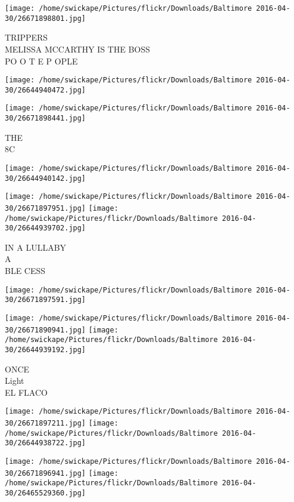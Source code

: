 \documentclass[10pt,letterpaper]{article}
\begin{document}
\vspace{0.25in}
\texttt{[image: /home/swickape/Pictures/flickr/Downloads/Baltimore 2016-04-30/26671898801.jpg]}

TRIPPERS\\
MELISSA MCCARTHY IS THE BOSS\\
PO O T E P OPLE
\pagebreak

\texttt{[image: /home/swickape/Pictures/flickr/Downloads/Baltimore 2016-04-30/26644940472.jpg]}

\vspace{0.25in}
\texttt{[image: /home/swickape/Pictures/flickr/Downloads/Baltimore 2016-04-30/26671898441.jpg]}

THE\\
8C
\pagebreak

\texttt{[image: /home/swickape/Pictures/flickr/Downloads/Baltimore 2016-04-30/26644940142.jpg]}

\vspace{0.25in}
\texttt{[image: /home/swickape/Pictures/flickr/Downloads/Baltimore 2016-04-30/26671897951.jpg]}
\texttt{[image: /home/swickape/Pictures/flickr/Downloads/Baltimore 2016-04-30/26644939702.jpg]}

IN A LULLABY\\
A\\
BLE CESS
\pagebreak

\texttt{[image: /home/swickape/Pictures/flickr/Downloads/Baltimore 2016-04-30/26671897591.jpg]}

\vspace{0.25in}
\texttt{[image: /home/swickape/Pictures/flickr/Downloads/Baltimore 2016-04-30/26671890941.jpg]}
\texttt{[image: /home/swickape/Pictures/flickr/Downloads/Baltimore 2016-04-30/26644939192.jpg]}

ONCE\\
Light\\
EL FLACO
\pagebreak

\texttt{[image: /home/swickape/Pictures/flickr/Downloads/Baltimore 2016-04-30/26671897211.jpg]}
\texttt{[image: /home/swickape/Pictures/flickr/Downloads/Baltimore 2016-04-30/26644938722.jpg]}

\texttt{[image: /home/swickape/Pictures/flickr/Downloads/Baltimore 2016-04-30/26671896941.jpg]}
\texttt{[image: /home/swickape/Pictures/flickr/Downloads/Baltimore 2016-04-30/26465529360.jpg]}
\end{document}
